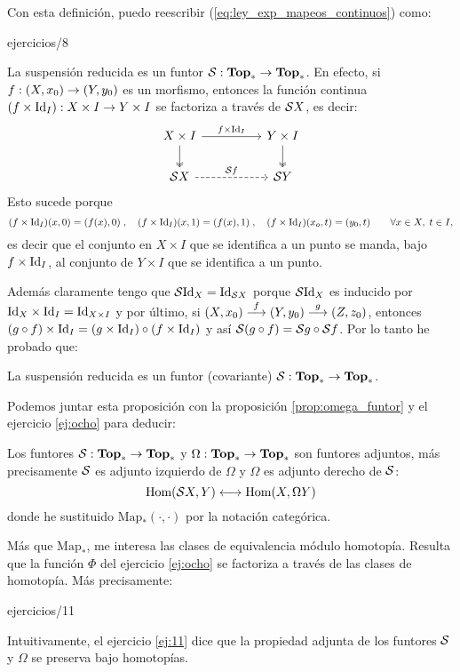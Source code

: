 \documentclass[../../topologia_algebraica]{subfiles}
\begin{document}
Con esta definici\'on, puedo reescribir (\ref{eq:ley_exp_mapeos_continuos}) como:

{ejercicios/8}  %

La suspensi\'on reducida es un funtor
$\mathcal{S}:\mathbf{Top}_*\rightarrow\mathbf{Top}_*$. En efecto, si $f:(X,x_0)\rightarrow (Y,y_0)$ es un morfismo,
entonces la funci\'on continua $(f\times\text{Id}_I):X\times I \rightarrow Y\times I$ se factoriza a trav\'es
de $\mathcal{S} X$, es decir:
\[
  \begin{tikzcd}
    X\times I \arrow[rr,"f\times\Id_I"] \arrow[d,twoheadrightarrow] & &
    Y\times I \arrow[d,twoheadrightarrow]\\
    \Ss X \arrow[rr,dashed,"\Ss f"] & & \Ss Y
  \end{tikzcd}
\]
Esto sucede porque
\[
  (f\times\text{Id}_I)(x,0)=(f(x),0)\; ,\quad (f\times\text{Id}_I)(x,1)=(f(x),1)\; ,\quad
  (f\times\text{Id}_I)(x_o,t)=(y_0,t) \qquad\forall x\in X, \; t\in I,
\]
es decir que el conjunto en $X\times I$ que se identifica a un punto se manda, bajo $f\times\text{Id}_I$,
al conjunto de $Y\times I$ que se identifica a un punto.

Adem\'as claramente tengo que $\mathcal{S}\text{Id}_X=\text{Id}_{\mathcal{S} X}$ porque $\mathcal{S}\text{Id}_X$ es inducido por
$\text{Id}_X\times\text{Id}_I=\text{Id}_{X\times I}$ y por \'ultimo, si $(X,x_0)\overset{f}{\longrightarrow}(Y,y_0)\overset{g}{\longrightarrow}(Z,z_0)$,
entonces $(g\circ f)\times\text{Id}_I=(g\times\text{Id}_I)\circ(f\times\text{Id}_I)$ y as\'i
$\mathcal{S}(g\circ f)=\mathcal{S} g\circ\mathcal{S} f$. Por lo tanto he probado que:

\begin{prop}
  La suspensi\'on reducida es un funtor (covariante) $\mathcal{S}:\mathbf{Top}_*\rightarrow\mathbf{Top}_*$.
\end{prop}

Podemos juntar esta proposici\'on con la proposici\'on \ref{prop:omega_funtor} y el ejercicio
\ref{ej:ocho} para deducir:

\begin{cor}
  Los funtores $\mathcal{S}:\mathbf{Top}_*\rightarrow\mathbf{Top}_*$ y $\Omega:\mathbf{Top}_*\rightarrow\mathbf{Top}_*$
  son funtores adjuntos, m\'as precisamente $\mathcal{S}$ es adjunto izquierdo de $\Omega$ y $\Omega$ es
  adjunto derecho de $\mathcal{S}$:
  \[
    \text{Hom}(\mathcal{S} X,Y) \longleftrightarrow \text{Hom}(X,\Omega Y)
  \]
  donde he sustituido $\text{Map}_*(\cdot,\cdot)$ por la notaci\'on categ\'orica.
\end{cor}

M\'as que $\text{Map}_*$, me interesa las clases de equivalencia m\'odulo homotop\'ia.
Resulta que la funci\'on $\Phi$ del ejercicio \ref{ej:ocho} se factoriza a trav\'es de
las clases de homotop\'ia. M\'as precisamente:

{ejercicios/11} %

Intuitivamente, el ejercicio \ref{ej:11} dice que la propiedad adjunta de los funtores
$\mathcal{S}$ y $\Omega$ se preserva bajo homotop\'ias.
\end{document}
